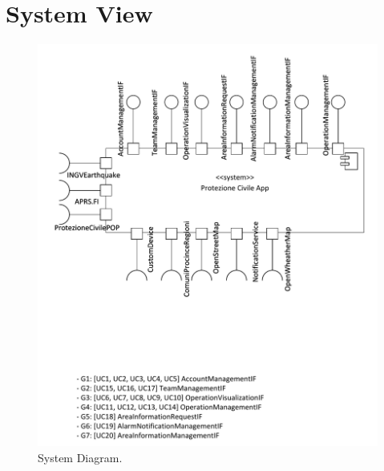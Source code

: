 \section{System View}

\begin{figure}[h!]
	\centering
	\includegraphics[width=0.8\linewidth]{./Iterazione 1/OtherFiles/UML - System View}
	\caption{System Diagram.}
	\label{fig:SystemDiagram}
\end{figure}